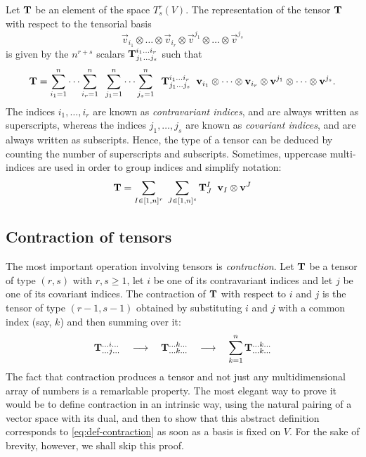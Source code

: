 Let $\mathbf{T}$ be an element of the space $T_s^r(V)$.
The representation of the tensor $\mathbf{T}$ with respect to the
tensorial basis
\[
\vec{v}_{i_1} \otimes \dots \otimes \vec{v}_{i_r}
\otimes
\vec{v}^{j_1} \otimes \dots \otimes \vec{v}^{j_s}
\]
is given by the $n^{r+s}$ scalars $\mathbf{T}^{i_1 \dots i_r}_{j_1 \dots j_s}$
such that
\[
\mathbf{T} = \sum_{i_1=1}^n \dots \sum_{i_r=1}^n \;\;
\sum_{j_1=1}^n \dots \sum_{j_s=1}^n \;\;
\mathbf{T}^{i_1 \dots i_r}_{j_1 \dots j_s} \;\;
\mathbf{v}_{i_1} \otimes \dots \otimes \mathbf{v}_{i_r}
\otimes
\mathbf{v}^{j_1} \otimes \dots \otimes \mathbf{v}^{j_s}.
\]
The indices $i_1, \dots, i_r$ are known as \emph{contravariant indices},
and are always written as superscripts, whereas the indices $j_1, \dots, j_s$
are known as \emph{covariant indices}, and are always written as subscripts.
Hence, the type of a tensor can be deduced by counting the number
of superscripts and subscripts. Sometimes, uppercase multi-indices are
used in order to group indices and simplify notation:
\[
\mathbf{T} = \sum_{I \in [1,n]^r} \; \sum_{J \in [1,n]^s}
\mathbf{T}^I_J \;\; \mathbf{v}_I \otimes \mathbf{v}^J
\]

\subsection*{Contraction of tensors}

The most important operation involving tensors is \emph{contraction}.
Let $\mathbf{T}$ be a tensor of type $(r,s)$ with $r,s \geq 1$, let
$i$ be one of its contravariant indices and let $j$ be one of its
covariant indices.
The contraction of $\mathbf{T}$ with respect to $i$ and $j$ is the tensor
of type $(r-1,s-1)$ obtained by substituting $i$ and $j$ with
a common index (say, $k$) and then summing over it:
\begin{equation} \label{eq:def-contraction}
\mathbf{T}^{\dots i \dots}_{\dots j \dots}
\quad \longrightarrow \quad
\mathbf{T}^{\dots k \dots}_{\dots k \dots}
\quad \longrightarrow \quad
\sum_{k=1}^n \mathbf{T}^{\dots k \dots}_{\dots k \dots}
\end{equation}
The fact that contraction produces a tensor and not just any multidimensional
array of numbers is a remarkable property. The most elegant way to prove
it would be to define contraction in an intrinsic way, using the
natural pairing of a vector space with its dual, and then to show
that this abstract definition corresponds to \eqref{eq:def-contraction}
as soon as a basis is fixed on $V$. For the sake of brevity, however,
we shall skip this proof.

